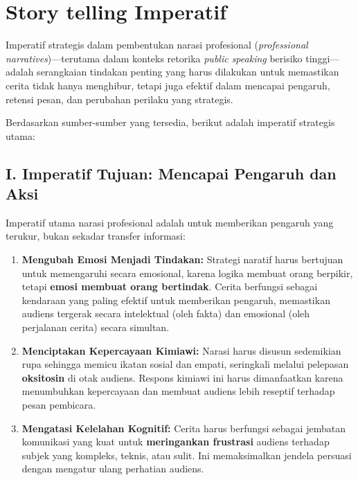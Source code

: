 \documentclass[
  letterpaper,
  DIV=11,
  numbers=noendperiod]{scrreprt}
\providecommand{\tightlist}{%
  \setlength{\itemsep}{0pt}\setlength{\parskip}{0pt}}
\begin{document}
\section{Story telling Imperatif}\label{story-telling-imperatif}

Imperatif strategis dalam pembentukan narasi profesional
(\emph{professional narratives})---terutama dalam konteks retorika
\emph{public speaking} berisiko tinggi---adalah serangkaian tindakan
penting yang harus dilakukan untuk memastikan cerita tidak hanya
menghibur, tetapi juga efektif dalam mencapai pengaruh, retensi pesan,
dan perubahan perilaku yang strategis.

Berdasarkan sumber-sumber yang tersedia, berikut adalah imperatif
strategis utama:

\subsection{I. Imperatif Tujuan: Mencapai Pengaruh dan
Aksi}\label{i.-imperatif-tujuan-mencapai-pengaruh-dan-aksi}

Imperatif utama narasi profesional adalah untuk memberikan pengaruh yang
terukur, bukan sekadar transfer informasi:

\begin{enumerate}
\def\labelenumi{\arabic{enumi}.}
\tightlist
\item
  \textbf{Mengubah Emosi Menjadi Tindakan:} Strategi naratif harus
  bertujuan untuk memengaruhi secara emosional, karena logika membuat
  orang berpikir, tetapi \textbf{emosi membuat orang bertindak}. Cerita
  berfungsi sebagai kendaraan yang paling efektif untuk memberikan
  pengaruh, memastikan audiens tergerak secara intelektual (oleh fakta)
  dan emosional (oleh perjalanan cerita) secara simultan.
\item
  \textbf{Menciptakan Kepercayaan Kimiawi:} Narasi harus disusun
  sedemikian rupa sehingga memicu ikatan sosial dan empati, seringkali
  melalui pelepasan \textbf{oksitosin} di otak audiens. Respons kimiawi
  ini harus dimanfaatkan karena menumbuhkan kepercayaan dan membuat
  audiens lebih reseptif terhadap pesan pembicara.
\item
  \textbf{Mengatasi Kelelahan Kognitif:} Cerita harus berfungsi sebagai
  jembatan komunikasi yang kuat untuk \textbf{meringankan frustrasi}
  audiens terhadap subjek yang kompleks, teknis, atau sulit. Ini
  memaksimalkan jendela persuasi dengan mengatur ulang perhatian
  audiens.
\end{enumerate}
\end{document}
